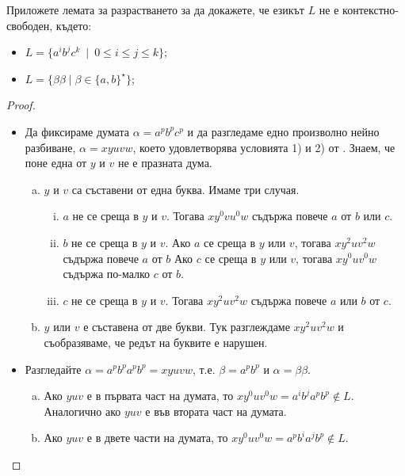 
\begin{example}
  Приложете лемата за разрастването за да докажете, че
  езикът $L$ не е контекстно-свободен, където:
  \begin{itemize}
  \item
    $L = \{a^ib^jc^k\ \mid\ 0 \leq i \leq j \leq k\}$;
  \item
    $L = \{\beta\beta\mid \beta\in \{a,b\}^\star\}$;
  \end{itemize}
\end{example}
\begin{proof}
  \begin{itemize}
  \item
    Да фиксираме думата $\alpha = a^pb^pc^p$ и да разгледаме
    едно произволно нейно разбиване, $\alpha = xyuvw$, което удовлетворява 
    условията 1) и 2) от .
    Знаем, че поне една от $y$ и $v$ не е празната дума.
    \begin{enumerate}[a)]
    \item
      $y$ и $v$ са съставени от една буква.
      Имаме три случая.
      \begin{enumerate}[i)]
      \item
        $a$ не се среща в $y$ и $v$.
        Тогава $xy^0vu^0w$ съдържа повече $a$ от $b$ или $c$.
      \item
        $b$ не се среща в $y$ и $v$.
        Ако $a$ се среща в $y$ или $v$, тогава $xy^2uv^2w$ съдържа повече $a$ от $b$
        Ако $c$ се среща в $y$ или $v$, тогава $xy^0uv^0w$ съдържа по-малко $c$ от $b$.
      \item
        $c$ не се среща в $y$ и $v$.
        Тогава $xy^2uv^2w$ съдържа повече $a$ или $b$ от $c$.
      \end{enumerate}      
    \item
      $y$ или $v$ е съставена от две букви.
      Тук разглеждаме $xy^2uv^2w$ и съобразяваме, че редът на буквите е нарушен.
    \end{enumerate}
  \item
    Разгледайте $\alpha = a^pb^pa^pb^p = xyuvw$,
    т.е. $\beta = a^pb^p$ и $\alpha = \beta\beta$.
    \begin{enumerate}[a)]
    \item
      Ако $yuv$ е в първата част на думата, то 
      $xy^0uv^0w = a^ib^ja^pb^p \not\in L$.
      Аналогично ако $yuv$ е във втората част на думата.
    \item
      Ако $yuv$ е в двете части на думата, то 
      $xy^0uv^0w = a^pb^ia^jb^p \not\in L$.
    \end{enumerate}    
  \end{itemize}
\end{proof}


